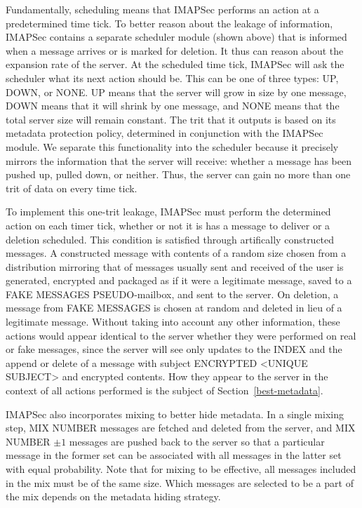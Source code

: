\documentclass[pageno]{jpaper}
\newcommand{\project}{IMAPSec }
\begin{document}
Fundamentally, scheduling means that \project performs an action at a predetermined time tick. To better reason about the leakage of information, \project contains a separate scheduler module (shown above) that is informed when a message arrives or is marked for deletion. It thus can reason about the expansion rate of the server. At the scheduled time tick, \project will ask the scheduler what its next action should be. This can be one of three types: UP, DOWN, or NONE. UP means that the server will grow in size by one message, DOWN means that it will shrink by one message, and NONE means that the total server size will remain constant. The trit that it outputs is based on its metadata protection policy, determined in conjunction with the \project module. We separate this functionality into the scheduler because it precisely mirrors the information that the server will receive: whether a message has been pushed up, pulled down, or neither. Thus, the server can gain no more than one trit of data on every time tick.

To implement this one-trit leakage, \project must perform the determined action on each timer tick, whether or not it is has a message to deliver or a deletion scheduled. This condition is satisfied through artifically constructed messages. A constructed message with contents of a random size chosen from a distribution mirroring that of messages usually sent and received of the user is generated, encrypted and packaged as if it were a legitimate message, saved to a FAKE MESSAGES PSEUDO-mailbox, and sent to the server. On deletion, a message from FAKE MESSAGES is chosen at random and deleted in lieu of a legitimate message. Without taking into account any other information, these actions would appear identical to the server whether they were performed on real or fake messages, since the server will see only updates to the INDEX and the append or delete of a message with subject ENCRYPTED <UNIQUE SUBJECT> and encrypted contents. How they appear to the server in the context of all actions performed is the subject of Section~\ref{best-metadata}.

\project also incorporates mixing to better hide metadata. In a single mixing step, MIX NUMBER messages are fetched and deleted from the server, and MIX NUMBER $\pm 1$ messages are pushed back to the server so that a particular message in the former set can be associated with all messages in the latter set with equal probability. Note that for mixing to be effective, all messages included in the mix must be of the same size. Which messages are selected to be a part of the mix depends on the metadata hiding strategy.
\end{document}

